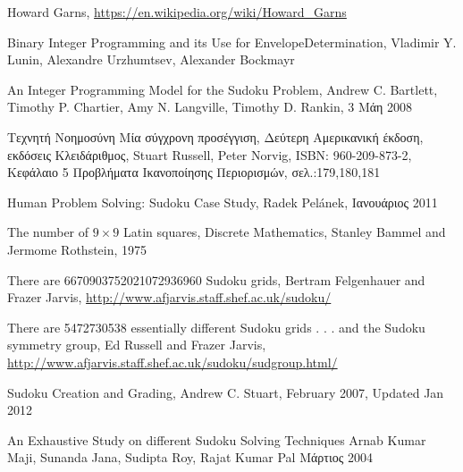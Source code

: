 \documentclass[12pt]{book}
\theoremstyle{definition}
\begin{document}
\begin{thebibliography}{99}
	Howard Garns,
	\url{https://en.wikipedia.org/wiki/Howard_Garns}

	Binary Integer Programming and its Use for EnvelopeDetermination,
	Vladimir Y. Lunin, Alexandre Urzhumtsev, Alexander Bockmayr

	An Integer Programming Model for the Sudoku Problem,
	Andrew C. Bartlett,	Timothy P. Chartier, Amy N. Langville, Timothy D. Rankin,
	3 Μάη 2008

	Τεχνητή Νοημοσύνη Μία σύγχρονη προσέγγιση, Δεύτερη Αμερικανική έκδοση, εκδόσεις Κλειδάριθμος,
	Stuart Russell, Peter Norvig,
	ISBN: 960-209-873-2,
	Κεφάλαιο 5 Προβλήματα Ικανοποίησης Περιορισμών, σελ.:179,180,181

	Human Problem Solving: Sudoku Case Study,
	Radek Pelánek,
	Ιανουάριος 2011

	The number of \(9 \times 9\) Latin squares, Discrete Mathematics,
	Stanley Bammel and Jermome Rothstein,
	1975

	There are 6670903752021072936960 Sudoku grids,
	Bertram Felgenhauer and Frazer Jarvis,
	\url{ http://www.afjarvis.staff.shef.ac.uk/sudoku/}

	There are 5472730538 essentially different Sudoku grids . . . and the
	Sudoku symmetry group,
	Ed Russell and Frazer Jarvis,
	\url{ http://www.afjarvis.staff.shef.ac.uk/sudoku/sudgroup.html/}

	Sudoku Creation and Grading,
	Andrew C. Stuart,
	February 2007, Updated Jan 2012

	An Exhaustive Study on different Sudoku Solving
Techniques
	Arnab Kumar Maji, Sunanda Jana, Sudipta Roy, Rajat Kumar Pal
	Μάρτιος 2004

\end{thebibliography}
\end{document}
